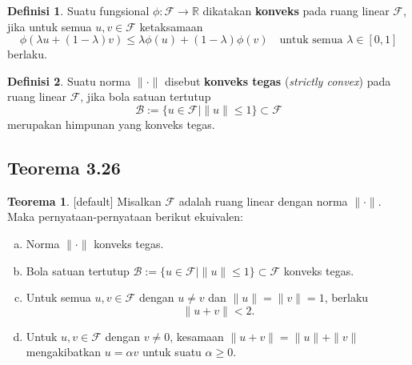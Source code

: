 \documentclass[aspectratio=169,11pt]{beamer}
\theoremstyle{definition}
\newtheorem{definisi}{Definisi}
\newtheorem{teorema}{Teorema}
\newcommand{\R}{\mathbb{R}}
\begin{document}
\begin{frame}{\insertsection}{\insertsubsection}
  \setcounter{definisi}{21}
  \begin{definisi}
    Suatu fungsional $\phi : \mathcal{F} \to \R$ dikatakan \textbf{konveks} pada ruang linear $\mathcal{F}$, jika untuk semua $u,v \in \mathcal{F}$ ketaksamaan
    \begin{equation}
      \phi(\lambda u + (1 - \lambda)v) \leq \lambda \phi(u) + (1 - \lambda)\phi(v) \quad \text{untuk semua } \lambda \in [0,1] \label{eq:3.14}
    \end{equation}
    berlaku.
  \end{definisi}
  \setcounter{definisi}{23}
  \begin{definisi}\label{def:3.24}
    Suatu norma $\|\cdot\|$ disebut \textbf{konveks tegas} (\textit{strictly convex}) pada ruang linear $\mathcal{F}$, jika bola satuan tertutup
    \begin{equation*}
      \mathcal{B} := \{ u \in \mathcal{F} \mid \|u\| \leq 1 \} \subset \mathcal{F}
    \end{equation*}
    merupakan himpunan yang konveks tegas.
  \end{definisi}
\end{frame}


\subsection{Teorema 3.26}

\begin{frame}{\insertsection}{\insertsubsection}
  \setcounter{teorema}{25}
  \begin{teorema}\label{thm:3.26}
    [default]
    Misalkan $\mathcal{F}$ adalah ruang linear dengan norma $\|\cdot\|$. Maka pernyataan-pernyataan berikut ekuivalen:
    \begin{enumerate}[(a)]
      \item Norma $\|\cdot\|$ konveks tegas.
      \item Bola satuan tertutup $\mathcal{B} := \{u \in \mathcal{F} \mid \|u\| \leq 1\} \subset \mathcal{F}$ konveks tegas.
      \item Untuk semua $u,v \in \mathcal{F}$ dengan $u \neq v$ dan $\|u\| = \|v\| = 1$, berlaku
            \begin{equation*}
              \|u+v\| < 2.
            \end{equation*}
      \item Untuk $u,v \in \mathcal{F}$ dengan $v \neq 0$, kesamaan $\|u+v\| = \|u\| + \|v\|$ mengakibatkan $u = \alpha v$ untuk suatu $\alpha \geq 0$.
    \end{enumerate}
  \end{teorema}
\end{frame}
\end{document}
